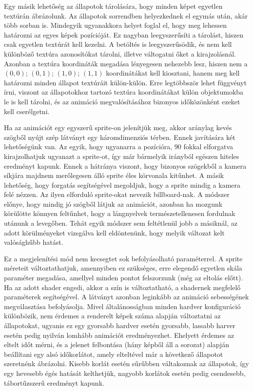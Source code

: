 Egy másik lehetőség az állapotok tárolására, hogy minden képet egyetlen textúrán ábrázolunk. Az állapotok sorrendben helyezkednek el egymás után, akár több sorban is. Mindegyik ugyanakkora helyet foglal el, hogy meg lehessen határozni az egyes képek pozícióját. Ez nagyban leegyszerűsíti a tárolást, hiszen csak egyetlen textúrát kell kezelni. A betöltés is leegyszerűsödik, és nem kell különböző textúra azonosítókat tárolni, illetve váltogatni őket a kirajzolásnál. Azonban a textúra koordináták megadása lényegesen nehezebb lesz, hiszen nem a $(0, 0)$; $(0, 1)$; $(1, 0)$; $(1, 1)$ koordinátákat kell kiosztani, hanem meg kell határozni minden állapot textúráit külön-külön. Erre legtöbbször lehet függvényt írni, viszont az állapotokhoz tartozó textúra koordinátákat külön objektumokba le is kell tárolni, és az animáció megvalósításához bizonyos időközönként ezeket kell cserélgetni.

Ha az animációt egy egyszerű sprite-on jelenítjük meg, akkor aránylag kevés szögből nyújt szép látványt egy háromdimenziós térben. Ennek javítására két lehetőségünk van. Az egyik, hogy ugyanarra a pozícióra, 90 fokkal elforgatva kirajzolhatjuk ugyanazt a sprite-ot, így már bármelyik irányból egészen hiteles eredményt kapunk. Ennek a hátránya viszont, hogy bizonyos szögekből a kamera síkjára majdnem merőlegesen álló sprite éles körvonala kitűnhet. A másik lehetőség, hogy forgatás segítségével megoldjuk, hogy a sprite mindig a kamera felé nézzen. Az ilyen elforduló sprite-okat nevezik billboard-nak. A módszer előnye, hogy mindig jó szögből látjuk az animációt, azonban ha mozgunk körülötte könnyen feltűnhet, hogy a lángnyelvek természetellenesen fordulnak utánunk a levegőben. Tehát egyik módszer sem feltétlenül jobb a másiknál, az adott körülményeket vizsgálva kell eldöntenünk, hogy melyik változat kelt valósághűbb hatást.

Ez a megjelenítési mód nem kecsegtet sok befolyásolható paraméterrel. A sprite méreteit változtathatjuk, amennyiben ez szükséges, erre elegendő egyetlen skála paraméter megadása, amellyel minden pontot felszorzunk (még az eltolás előtt). Ha az adott shader engedi, akkor a szín is változtatható, a shadernek megfelelő paraméterek segítségével. A látványt azonban leginkább az animáció sebességének megválasztása befolyásolja. Mivel általánosságban minden hardver konfiguráció különbözik, nem érdemes a renderelt képek száma alapján változtatni az állapotokat, ugyanis ez egy gyorsabb hardver esetén gyorsabb, lassabb harver esetén pedig nyilván lomhább animációt eredményezhet. Ehelyett érdemes az eltelt időt mérni, és a jelenet felbontása (hány képből áll a sorozat) alapján beállítani egy alsó időkorlátot, amely elteltével már a következő állapotot szeretnénk ábrázolni. Kisebb korlát esetén sűrűbben váltakoznak az állapotok, így egy hevesebb égés hatását kelthetjük, nagyobb korlátok esetén pedig csendesebb, tábortűzszerű eredményt kapunk.

